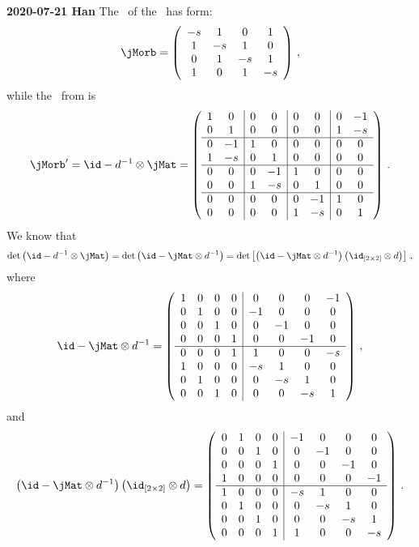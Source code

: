 {\bf 2020-07-21 Han}
The \jacobianOrb\ of the \templatt\ has form:
\[
\jMorb
=
\left(
\begin{array}{cccc}
 -s & 1 & 0 & 1 \\
 1 & -s & 1 & 0 \\
 0 & 1 & -s & 1 \\
 1 & 0 & 1 & -s \\
\end{array}
\right)
\, ,
\]
while the \jacobianOrb\ from  is
\[
\jMorb'=\id- \shift^{-1} \otimes \jMat
=
\left(
\begin{array}{cc|cc|cc|cc}
 1 & 0 & 0 & 0 & 0 & 0 & 0 & -1 \\
 0 & 1 & 0 & 0 & 0 & 0 & 1 & -s \\ \hline
 0 & -1 & 1 & 0 & 0 & 0 & 0 & 0 \\
 1 & -s & 0 & 1 & 0 & 0 & 0 & 0 \\ \hline
 0 & 0 & 0 & -1 & 1 & 0 & 0 & 0 \\
 0 & 0 & 1 & -s & 0 & 1 & 0 & 0 \\ \hline
 0 & 0 & 0 & 0 & 0 & -1 & 1 & 0 \\
 0 & 0 & 0 & 0 & 1 & -s & 0 & 1 \\
\end{array}
\right)
\, .
\]
We know that
\[
\det \left( \id- \shift^{-1} \otimes \jMat \right)
=
\det \left( \id-\jMat \otimes \shift^{-1} \right)
=
\det \left[\left( \id-\jMat \otimes \shift^{-1} \right) \left( \id_{[2\times 2]} \otimes \shift \right)\right]
\, ,
\]
where
\[
\id-\jMat \otimes \shift^{-1}
=
\left(
\begin{array}{cccc|cccc}
 1 & 0 & 0 & 0 & 0 & 0 & 0 & -1 \\
 0 & 1 & 0 & 0 & -1 & 0 & 0 & 0 \\
 0 & 0 & 1 & 0 & 0 & -1 & 0 & 0 \\
 0 & 0 & 0 & 1 & 0 & 0 & -1 & 0 \\ \hline
 0 & 0 & 0 & 1 & 1 & 0 & 0 & -s \\
 1 & 0 & 0 & 0 & -s & 1 & 0 & 0 \\
 0 & 1 & 0 & 0 & 0 & -s & 1 & 0 \\
 0 & 0 & 1 & 0 & 0 & 0 & -s & 1 \\
\end{array}
\right)
\, ,
\]
and
\[
\left( \id-\jMat \otimes \shift^{-1} \right) \left( \id_{[2\times 2]} \otimes \shift \right)
=
\left(
\begin{array}{cccc|cccc}
 0 & 1 & 0 & 0 & -1 & 0 & 0 & 0 \\
 0 & 0 & 1 & 0 & 0 & -1 & 0 & 0 \\
 0 & 0 & 0 & 1 & 0 & 0 & -1 & 0 \\
 1 & 0 & 0 & 0 & 0 & 0 & 0 & -1 \\ \hline
 1 & 0 & 0 & 0 & -s & 1 & 0 & 0 \\
 0 & 1 & 0 & 0 & 0 & -s & 1 & 0 \\
 0 & 0 & 1 & 0 & 0 & 0 & -s & 1 \\
 0 & 0 & 0 & 1 & 1 & 0 & 0 & -s \\
\end{array}
\right)
\,.
\]

